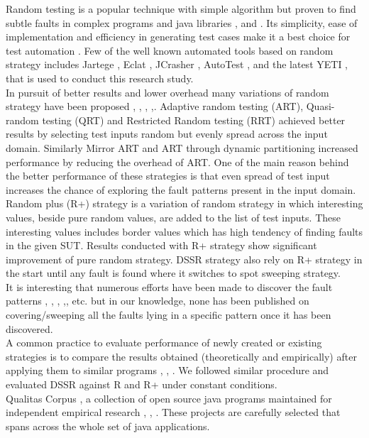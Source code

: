 \documentclass[conference]{IEEEtran}
\begin{document}
Random testing is a popular technique with simple algorithm but proven to find subtle faults in complex programs and java libraries \cite{Pacheco2005}, \cite{Csallner2004} and \cite{Claessen2000a}. Its simplicity, ease of implementation and efficiency in generating test cases make it a best choice for test automation \cite{Hamlet1994}. Few of the well known automated tools based on random strategy includes Jartege \cite{Oriat2004}, Eclat \cite{Pacheco2005}, JCrasher \cite{Csallner2004}, AutoTest \cite{Ciupa2007}, \cite{Ciupa2008a} and the latest YETI \cite{Oriol2010}, \cite{Oriol2012}  that is used to conduct this research study.\\
\indent In pursuit of better results and lower overhead many variations of random strategy have been proposed \cite{Chen2010}, \cite{Chen2005}, \cite{Chan2002}, \cite{Chen2004a},\cite{Chen2003}. Adaptive random testing (ART), Quasi-random testing (QRT) and Restricted Random testing (RRT) achieved better results by selecting test inputs random but evenly spread across the input domain. Similarly Mirror ART and ART through dynamic partitioning increased performance by reducing the overhead of ART. One of the main reason behind the better performance of these strategies is that even spread of test input increases the chance of exploring the fault patterns present in the input domain.\\ 
\indent Random plus (R+) strategy \cite{Leitner2007} is a variation of random strategy in which interesting values, beside pure random values, are added to the list of test inputs. These interesting values includes border values \cite{Beizer1990} which has high tendency of finding faults in the given SUT. Results conducted with R+ strategy show significant improvement of pure random strategy. DSSR strategy also rely on R+ strategy in the start until any fault is found where it switches to spot sweeping strategy. \\
\indent It is interesting that numerous efforts have been made to discover the fault patterns \cite{Chen2010}, \cite{Chen2005}, \cite{Chan2002}, \cite{Chen2004a},\cite{Chen2003}, etc. but in our knowledge, none has been published on covering/sweeping all the faults lying in a specific pattern once it has been discovered.\\
\indent A common practice to evaluate performance of newly created or existing strategies is to compare the results obtained (theoretically and empirically) after applying them to similar programs \cite{Gutjahr1999}, \cite{Duran1984}, \cite{Hamlet1990}. We followed similar procedure and evaluated DSSR against R and R+ under constant conditions. \\
\indent Qualitas Corpus \cite{Tempero2010}, a collection of open source java programs maintained for independent empirical research \cite{Oriol2012}, \cite{Tempero2010a}, \cite{Tempero2008}. These projects are carefully selected that spans across the whole set of java applications.
\end{document}
